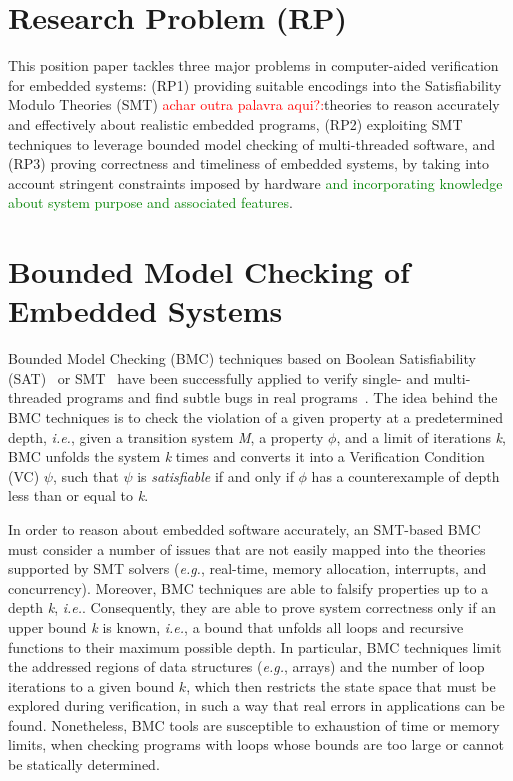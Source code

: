 \documentclass{acm_sen_article}
\begin{document}
\section{Research Problem (RP)}

This position paper tackles three major problems in computer-aided verification for embedded systems: (RP1) providing suitable encodings into the Satisfiability Modulo Theories (SMT) \cite{BarrettSST09} \textcolor{red}{achar outra palavra aqui?:}theories to reason accurately and effectively about realistic embedded programs, (RP2) exploiting SMT techniques to leverage bounded model checking of multi-threaded software, and (RP3) proving correctness and timeliness of embedded systems, by taking into account stringent constraints imposed by hardware \textcolor{green}{and incorporating knowledge about system purpose and associated features}.

\section{Bounded Model Checking of Embedded Systems}

Bounded Model Checking (BMC) techniques based on Boolean Satisfiability (SAT)~\cite{handbook09} or SMT~\cite{BarrettSST09} have been successfully applied to verify single- and multi-threaded programs and find subtle bugs in real programs~\cite{Clarke04,MerzFS12,CordeiroF11,Ivancic05,Cordeiro12}. The idea behind the BMC techniques is to check the violation of a given property at a predetermined depth, {\it i.e.}, given a transition system \textit{M}, a property $ \phi $, and a limit of iterations \textit{k}, BMC unfolds the system \textit{k} times and converts it into a Verification Condition (VC) $ \psi $, such that $\psi$ is \textit{satisfiable} if and only if $\phi$ has a counterexample of depth
less than or equal to \textit{k}.

In order to reason about embedded software accurately, an SMT-based BMC must consider a number of issues that are not easily mapped into the theories supported by SMT solvers ({\it e.g.}, real-time, memory allocation, interrupts, and concurrency). Moreover, BMC techniques are able to falsify properties up to a depth \textit{k}, {\it i.e.}. Consequently, they are able to prove system correctness only if an upper bound \textit{k} is known, {\it i.e.}, a bound that unfolds all loops and recursive functions to their maximum possible depth. In particular, BMC techniques limit the addressed regions of data structures ({\it e.g.}, arrays) and the number of loop iterations to a given bound $k$, which then restricts the state space that must be explored during verification, in such a way that real errors in applications \cite{Clarke04,MerzFS12,Ivancic05,Cordeiro12} can be found. Nonetheless, BMC tools are susceptible to exhaustion of time or memory limits, when checking programs with loops whose bounds are too large or cannot be statically determined.  
\end{document}
